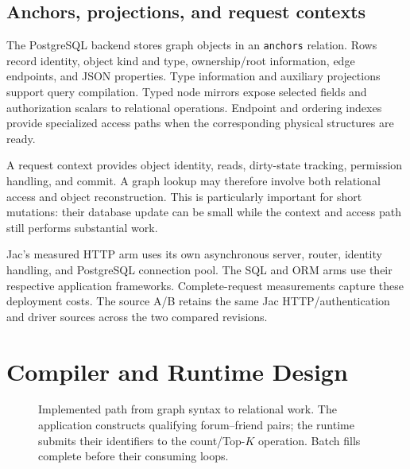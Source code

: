 \documentclass[sigconf,nonacm]{acmart}
\newcommand{\code}[1]{\texttt{#1}}
\begin{document}
\subsection{Anchors, projections, and request contexts}
The PostgreSQL backend stores graph objects in an \code{anchors} relation.
Rows record identity, object kind and type, ownership/root information,
edge endpoints, and JSON properties. Type information and auxiliary
projections support query compilation. Typed node mirrors expose selected
fields and authorization scalars to relational operations. Endpoint and
ordering indexes provide specialized access paths when the corresponding
physical structures are ready.

A request context provides object identity, reads, dirty-state tracking,
permission handling, and commit. A graph lookup may therefore involve both
relational access and object reconstruction. This is particularly important
for short mutations: their database update can be small while the context
and access path still performs substantial work.

Jac's measured HTTP arm uses its own asynchronous server, router, identity
handling, and PostgreSQL connection pool. The SQL and ORM arms use their
respective application frameworks. Complete-request measurements capture
these deployment costs. The source A/B retains the same Jac HTTP/authentication
and driver sources across the two compared revisions.

\section{Compiler and Runtime Design}
\label{sec:design}

\begin{figure}[t]
\centering
{}
\caption{Implemented path from graph syntax to relational work. The
application constructs qualifying forum--friend pairs; the runtime submits
their identifiers to the count/Top-$K$ operation. Batch fills complete before
their consuming loops.}
\label{fig:pipeline}
\end{figure}
\end{document}
